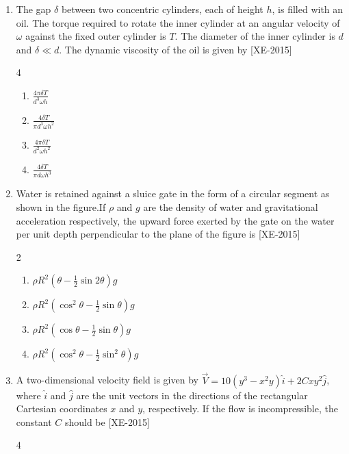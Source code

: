 \documentclass[journal]{IEEEtran}
\begin{document}
\begin{enumerate}
        \item  The gap $\delta$ between two concentric cylinders, each of height $h$, is filled with an oil. The torque required to rotate the inner cylinder at an angular velocity of $\omega$ against the fixed outer cylinder is $T$. The diameter of the inner cylinder is $d$ and $\delta \ll d$. The dynamic viscosity of the oil is given by \hfill{[XE-2015]}
    \begin{multicols}{4}
        
    
    \begin{enumerate}
        \item $\frac{4 \pi \delta T}{d^3 \omega h}$
        \item $\frac{4 \delta T}{\pi d^3 \omega h^2}$
        \item $\frac{4 \pi \delta T}{d^2 \omega h^2}$
        \item $\frac{4 \delta T}{\pi d \omega h^3}$
    \end{enumerate}
    \end{multicols}
    \item Water is retained against a sluice gate in the form of a circular segment as shown in the figure.If $\rho$ and $g$ are the density of water and gravitational acceleration respectively, the upward force exerted by the gate on the water per unit depth perpendicular to the plane of the figure is \hfill{[XE-2015]} \\
    
    \begin{multicols}{2}
    \begin{enumerate}
        
    \item $\rho R^2 \left( \theta - \frac{1}{2} \sin 2 \theta \right) g$
    \item $\rho R^2 \left( \cos^2 \theta - \frac{1}{2} \sin \theta \right) g$
    \item $\rho R^2 \left( \cos \theta - \frac{1}{2} \sin \theta \right) g$
    \item $\rho R^2 \left( \cos^2 \theta - \frac{1}{2} \sin^2 \theta \right) g$
\end{enumerate}
        
    
        
    \end{multicols}

   
\item A two-dimensional velocity field is given by $\vec{V} = 10(y^3 - x^2 y)\hat{i} + 2Cxy^2\hat{j}$, where $\hat{i}$ and $\hat{j}$ are the unit vectors in the directions of the rectangular Cartesian coordinates $x$ and $y$, respectively. If the flow is incompressible, the constant $C$ should be \hfill{[XE-2015]}
\begin{multicols}{4}
    


\end{multicols}
\end{enumerate}
\end{document}

